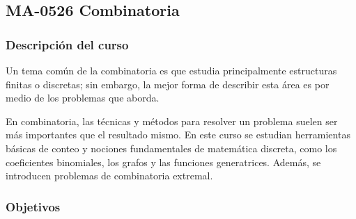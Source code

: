 \newpage
\subsection*{MA-0526 Combinatoria}

\hypertarget{MA0526}{}
\begin{refsection}
\begin{table}[H]
\end{table}

\subsubsection*{Descripción del curso}

Un tema común de la combinatoria es que estudia principalmente estructuras finitas o discretas; sin embargo, la mejor forma de describir esta área es por medio de los problemas que aborda.

En combinatoria, las técnicas y métodos para resolver un problema suelen ser más importantes que el resultado mismo. En este curso se estudian herramientas básicas de conteo y nociones fundamentales de matemática discreta, como los coeficientes binomiales, los grafos y las funciones generatrices. Además, se introducen problemas de combinatoria extremal.

\subsubsection*{Objetivos}


\end{refsection}
